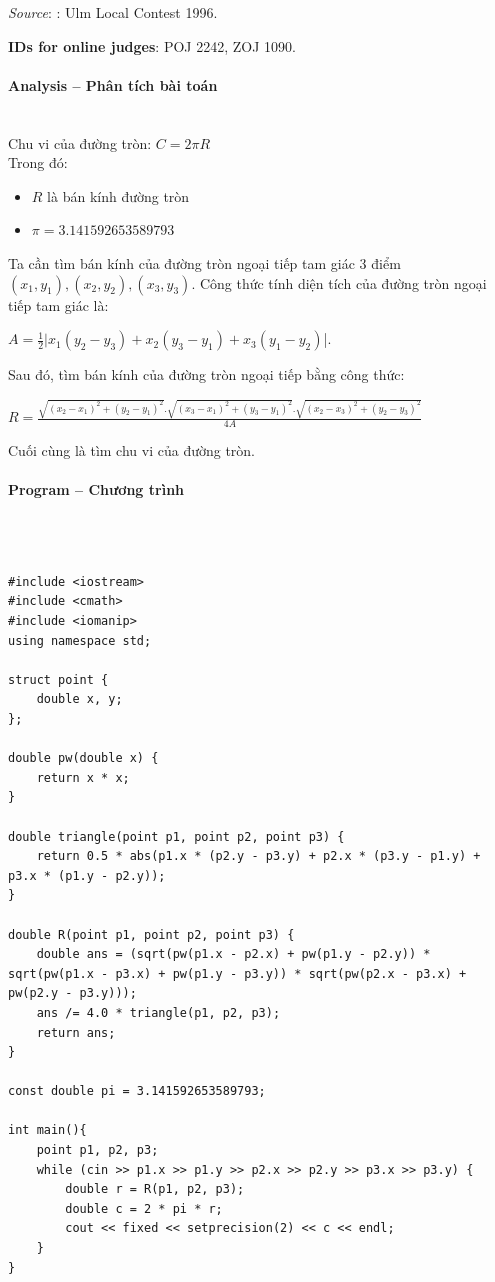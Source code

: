 \documentclass{article}
\begin{document}
\textit{Source}: : Ulm Local Contest 1996.

\textbf{IDs for online judges}: POJ 2242, ZOJ 1090.


\paragraph{Analysis -- Phân tích bài toán} \mbox{} \\

Chu vi của đường tròn: $C = 2 \pi R$\\
Trong đó:
\begin{itemize}
    \item $R$ là bán kính đường tròn
    \item $\pi = 3.141592653589793$ 
\end{itemize}

Ta cần tìm bán kính của đường tròn ngoại tiếp tam giác 3 điểm $(x_1,y_1), (x_2,y_2), (x_3,y_3)$. Công thức tính diện tích của đường tròn ngoại tiếp tam giác là: \\

\begin{center}
    $A = \frac{1}{2}|x_1(y_2-y_3) + x_2(y_3-y_1) + x_3(y_1-y_2)$|.    
\end{center}

Sau đó, tìm bán kính của đường tròn ngoại tiếp bằng công thức:

\begin{center}
    $R = \frac{\sqrt{(x_2-x_1)^2 +(y_2-y_1)^2}.\sqrt{(x_3-x_1)^2+(y_3-y_1)^2}.\sqrt{(x_2-x_3)^2+(y_2-y_3)^2}}{4A}$
\end{center}

Cuối cùng là tìm chu vi của đường tròn.

\paragraph{Program -- Chương trình} \mbox{} \\


\begin{lstlisting}

#include <iostream>
#include <cmath>
#include <iomanip>
using namespace std;

struct point {
	double x, y;
};

double pw(double x) {
	return x * x;
}

double triangle(point p1, point p2, point p3) {
	return 0.5 * abs(p1.x * (p2.y - p3.y) + p2.x * (p3.y - p1.y) + p3.x * (p1.y - p2.y));
}

double R(point p1, point p2, point p3) {
	double ans = (sqrt(pw(p1.x - p2.x) + pw(p1.y - p2.y)) * sqrt(pw(p1.x - p3.x) + pw(p1.y - p3.y)) * sqrt(pw(p2.x - p3.x) + pw(p2.y - p3.y)));
	ans /= 4.0 * triangle(p1, p2, p3);
	return ans;
}

const double pi = 3.141592653589793;

int main(){
	point p1, p2, p3;
	while (cin >> p1.x >> p1.y >> p2.x >> p2.y >> p3.x >> p3.y) {
		double r = R(p1, p2, p3);
		double c = 2 * pi * r;
		cout << fixed << setprecision(2) << c << endl;
	}
}

\end{lstlisting}
\end{document}
